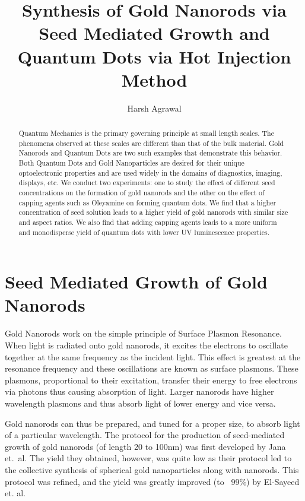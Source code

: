 \documentclass[journal=jacsat,manuscript=article]{achemso}
\author{Harsh Agrawal}
\affiliation[Imperial College London]
{Department of Bioengineering, Imperial College London}
\title[Preparation and Study of Gold Nanorods and Quantum Dots]
  {Synthesis of Gold Nanorods via Seed Mediated Growth and Quantum Dots via Hot Injection Method}
\begin{document}
\begin{abstract}
  Quantum Mechanics is the primary governing principle at small length scales. The phenomena observed at these scales are different than that of the bulk material. Gold Nanorods and Quantum Dots are two such examples that demonstrate this behavior. Both Quantum Dots and Gold Nanoparticles are desired for their unique optoelectronic properties and are used widely in the domains of diagnostics, imaging, displays, etc. We conduct two experiments: one to study the effect of different seed concentrations on the formation of gold nanorods and the other on the effect of capping agents such as Oleyamine on forming quantum dots. We find that a higher concentration of seed solution leads to a higher yield of gold nanorods with similar size and aspect ratios. We also find that adding capping agents leads to a more uniform and monodisperse yield of quantum dots with lower UV luminescence properties.
\end{abstract}

\section{Seed Mediated Growth of Gold Nanorods}
Gold Nanorods work on the simple principle of Surface Plasmon Resonance\cite{huang2010gold}. When light is radiated onto gold nanorods, it excites the electrons to oscillate together at the same frequency as the incident light. This effect is greatest at the resonance frequency and these oscillations are known as surface plasmons. These plasmons, proportional to their excitation, transfer their energy to free electrons via photons thus causing absorption of light. Larger nanorods have higher wavelength plasmons and thus absorb light of lower energy and vice versa.

Gold nanorods can thus be prepared, and tuned for a proper size, to absorb light of a particular wavelength. The protocol for the production of seed-mediated growth of gold nanorods (of length 20 to 100nm) was first developed by Jana et.\ al.\cite{jana_et_al} The yield they obtained, however, was quite low as their protocol led to the collective synthesis of spherical gold nanoparticles along with nanorods. This protocol was refined, and the yield was greatly improved (to ~99\%) by El-Sayeed et. al\cite{Nikoobakht_El_Sayed_2003}.
\end{document}
